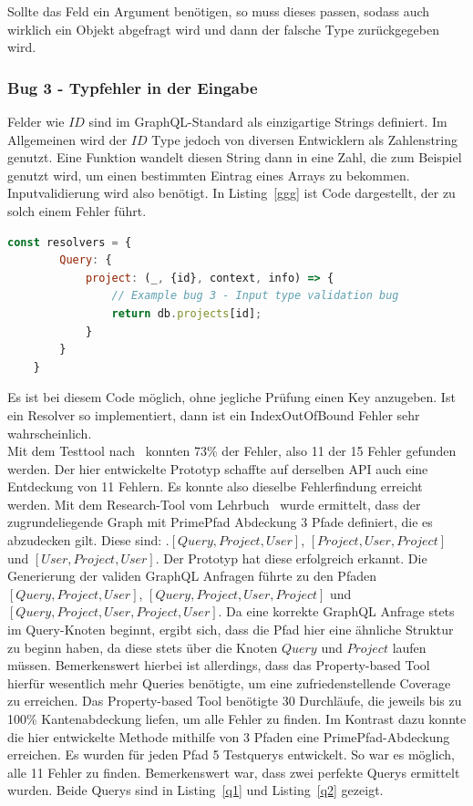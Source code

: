 Sollte das Feld ein Argument benötigen, so muss dieses passen, sodass auch wirklich ein Objekt abgefragt wird und dann der falsche Type zurückgegeben wird.

\subsubsection{Bug 3 - Typfehler in der Eingabe}

Felder wie $ID$ sind im GraphQL-Standard als einzigartige Strings definiert.
Im Allgemeinen wird der $ID$ Type jedoch von diversen Entwicklern als Zahlenstring genutzt.
Eine Funktion wandelt diesen String dann in eine Zahl, die zum Beispiel genutzt wird, um einen bestimmten Eintrag eines Arrays zu bekommen.
Inputvalidierung wird also benötigt.
In Listing~\ref{ggg} ist Code dargestellt, der zu solch einem Fehler führt.

\begin{lstlisting}[language=javascript, caption={Code ohne Inputvalidierung}, label={ggg}]
    const resolvers = {
        Query: {
            project: (_, {id}, context, info) => {
                // Example bug 3 - Input type validation bug
                return db.projects[id];
            }
        }
    }
\end{lstlisting}

Es ist bei diesem Code möglich, ohne jegliche Prüfung einen Key anzugeben.
Ist ein Resolver so implementiert, dann ist ein IndexOutOfBound Fehler sehr wahrscheinlich.
\\


Mit dem Testtool nach~\cite[Property-based Testing]{property-based-testing} konnten 73\% der Fehler, also 11 der 15 Fehler gefunden  werden.
Der hier entwickelte Prototyp schaffte auf derselben API auch eine Entdeckung von 11 Fehlern.
Es konnte also dieselbe Fehlerfindung erreicht werden.
Mit dem Research-Tool vom Lehrbuch~\cite{software-testing} wurde ermittelt, dass der zugrundeliegende Graph mit PrimePfad Abdeckung 3 Pfade definiert, die es abzudecken gilt.
Diese sind: $. [Query,Project,User]$, $[Project,User,Project]$ und $[User,Project,User]$.
Der Prototyp hat diese erfolgreich erkannt.
Die Generierung der validen GraphQL Anfragen führte zu den Pfaden $[Query, Project, User]$, $[Query, Project, User, Project]$ und $[Query, Project, User, Project, User]$.
Da eine korrekte GraphQL Anfrage stets im Query-Knoten beginnt, ergibt sich, dass die Pfad hier eine ähnliche Struktur zu beginn haben, da diese stets über die Knoten $Query$ und $Project$ laufen müssen.
Bemerkenswert hierbei ist allerdings, dass das Property-based Tool hierfür wesentlich mehr Queries benötigte, um eine zufriedenstellende Coverage zu erreichen.
Das Property-based Tool benötigte 30 Durchläufe, die jeweils bis zu 100\% Kantenabdeckung liefen, um alle Fehler zu finden.
Im Kontrast dazu konnte die hier entwickelte Methode mithilfe von 3 Pfaden eine PrimePfad-Abdeckung erreichen.
Es wurden für jeden Pfad 5 Testquerys entwickelt.
So war es möglich, alle 11 Fehler zu finden.
Bemerkenswert war, dass zwei perfekte Querys ermittelt wurden.
Beide Querys sind in Listing~\ref{q1} und Listing~\ref{q2} gezeigt. \\

